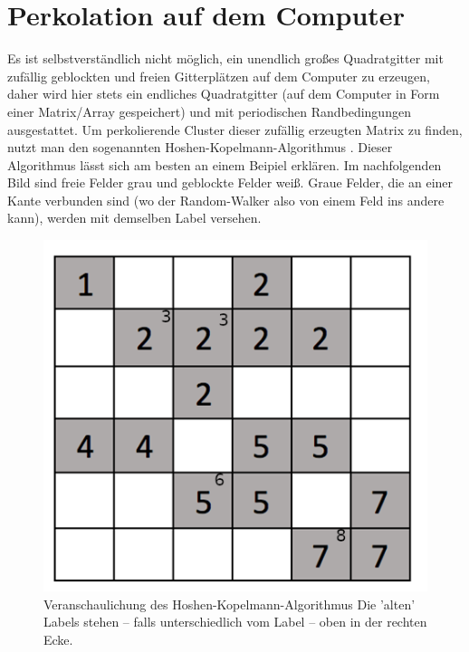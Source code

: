 \documentclass[a4paper, 12pt]{report}
\begin{document}
\section{Perkolation auf dem Computer}
Es ist selbstverständlich nicht möglich, ein unendlich großes Quadratgitter mit zufällig geblockten und freien Gitterplätzen auf dem Computer zu erzeugen, daher wird hier stets ein endliches Quadratgitter (auf dem Computer in Form einer Matrix/Array gespeichert) und mit periodischen Randbedingungen ausgestattet. Um perkolierende Cluster dieser zufällig erzeugten Matrix zu finden, nutzt man den sogenannten Hoshen-Kopelmann-Algorithmus \cite{Fricke}.
Dieser Algorithmus lässt sich am besten an einem Beipiel erklären. Im nachfolgenden Bild sind freie Felder grau und geblockte Felder weiß. Graue Felder, die an einer Kante verbunden sind (wo der Random-Walker also von einem Feld ins andere kann), werden mit demselben Label versehen.
\begin{figure}[h!]
	\centering
	\includegraphics[scale=0.5]{H-K_algorithm.png}
	\caption{Veranschaulichung des Hoshen-Kopelmann-Algorithmus \break Die 'alten' Labels stehen -- falls unterschiedlich vom Label -- oben in der rechten Ecke.}
\end{figure}

\newpage
\end{document}
